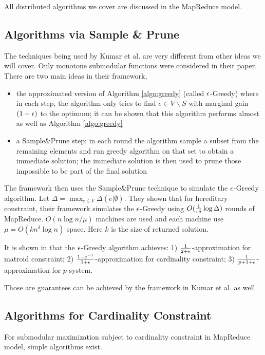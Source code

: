 All distributed algorithms we cover are discussed in the MapReduce model.

\subsection{Algorithms via Sample \& Prune}
The techniques being used by Kumar et al. \cite{KMV+15} are very different from other ideas we will cover. Only monotone submodular functions were considered in their paper. There are two main ideas in their framework,
\begin{itemize}
\item the approximated version of Algorithm \ref{algo:greedy} (called {\sc $\epsilon$-Greedy}) where in each step, the algorithm only tries to find $e\in V\backslash S$ with marginal gain $(1 - \epsilon)$ to the optimum; it can be shown that this algorithm performs almost as well as Algorithm \ref{algo:greedy}
\item a Sample\&Prune step: in each round the algorithm sample a subset from the remaining elements and run greedy algorithm on that set to obtain a immediate solution;  the immediate solution is then used to prune those impossible to be part of the final solution
\end{itemize}

The framework then uses the Sample\&Prune technique to simulate the {\sc $\epsilon$-Greedy} algorithm. Let $\Delta = \max_{e\in V} \Delta(e|\emptyset)$. They shown that for hereditary constraint, their framework simulates the {\sc $\epsilon$-Greedy} using $O(\frac{1}{\epsilon \delta}\log \Delta)$ rounds of MapReduce. $O(n\log n / \mu)$ machines are used and each machine use $\mu = O(k n^{\delta}\log n)$ space. Here $k$ is the size of returned solution.

It is shown in \cite{CCP+11} that the {\sc $\epsilon$-Greedy} algorithm achieves: 1)  $\frac{1}{2+\epsilon}$-approximation for matroid constraint; 2) $\frac{1 - e^{-1}}{1 + \epsilon}$-approximation for cardinality constraint; 3) $\frac{1}{p + 1 + \epsilon}$-approximation for $p$-system.

Those are guarantees can be achieved by the framework in Kumar et al. \cite{KMV+15} as well.


\subsection{Algorithms for Cardinality Constraint}
For submodular maximization subject to cardinality constraint in MapReduce model, simple algorithms exist.

